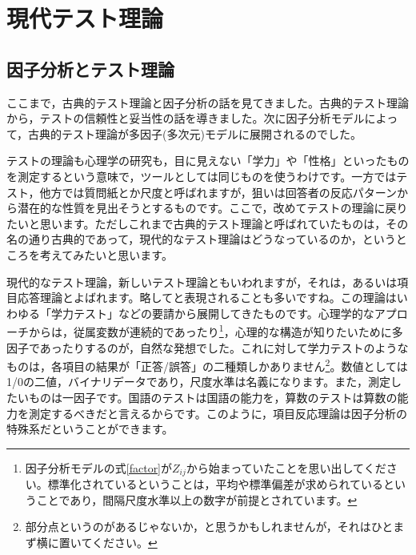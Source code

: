\documentclass{ltjsbook}
\begin{document}
 
\chapter{現代テスト理論} 
\label{chapter4} 
\section{因子分析とテスト理論}
ここまで，古典的テスト理論と因子分析の話を見てきました。古典的テスト理論から，テストの信頼性と妥当性の話を導きました。次に因子分析モデルによって，古典的テスト理論が多因子(多次元)モデルに展開されるのでした。

テストの理論も心理学の研究も，目に見えない「学力」や「性格」といったものを測定するという意味で，ツールとしては同じものを使うわけです。一方ではテスト，他方では質問紙とか尺度と呼ばれますが，狙いは回答者の反応パターンから潜在的な性質を見出そうとするものです。ここで，改めてテストの理論に戻りたいと思います。ただしこれまで古典的テスト理論と呼ばれていたものは，その名の通り古典的であって，現代的なテスト理論はどうなっているのか，というところを考えてみたいと思います。

現代的なテスト理論，新しいテスト理論ともいわれますが，それは，あるいは項目応答理論とよばれます。略してと表現されることも多いですね。この理論はいわゆる「学力テスト」などの要請から展開してきたものです。心理学的なアプローチからは，従属変数が連続的であったり\footnote{因子分析モデルの式\ref{factor}が$Z_{ij}$から始まっていたことを思い出してください。標準化されているということは，平均や標準偏差が求められているということであり，間隔尺度水準以上の数字が前提とされています。}，心理的な構造が知りたいために多因子であったりするのが，自然な発想でした。これに対して学力テストのようなものは，各項目の結果が「正答/誤答」の二種類しかありません\footnote{部分点というのがあるじゃないか，と思うかもしれませんが，それはひとまず横に置いてください。}。数値としては1/0の二値，バイナリデータであり，尺度水準は名義になります。また，測定したいものは一因子です。国語のテストは国語の能力を，算数のテストは算数の能力を測定するべきだと言えるからです。このように，項目反応理論は因子分析の特殊系だということができます。

\end{document}

